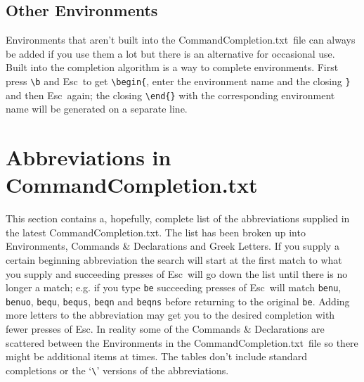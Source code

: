 \documentclass[11pt]{article}
\newcommand{\esckey}{\textsf{Esc}}
\newcommand{\CCT}{\textsf{CommandCompletion.txt}}
\begin{document}
\subsection*{Other Environments}

Environments that aren't built into the \CCT\ file can always be added if you use them a lot but there is an alternative for occasional use. Built into the completion algorithm is a way to complete environments. First press \verb|\b| and \esckey\ to get \verb|\begin{|, enter the environment name and the closing \texttt{\}} and then \esckey\ again; the closing \verb|\end{}| with the corresponding environment name will be generated on a separate line.

\section*{Abbreviations in \CCT}

This section contains a, hopefully, complete list of the abbreviations supplied in the latest \CCT. The list has been broken up into Environments, Commands \& Declarations and Greek Letters. If you supply a certain beginning abbreviation the search will start at the first match to what you supply and succeeding presses of \esckey\ will go down the list until there is no longer a match; e.g. if you type \texttt{be} succeeding presses of \esckey\ will match \texttt{benu}, \texttt{benuo}, \texttt{bequ}, \texttt{bequs}, \texttt{beqn} and \texttt{beqns} before returning to the original \texttt{be}. Adding more letters to the abbreviation may get you to the desired completion with fewer presses of \esckey. In reality some of the Commands \& Declarations are scattered between the Environments in the \CCT\ file so there might be additional items at times. The tables don't include standard completions or the `\verb"\"' versions of the abbreviations.
\end{document}
